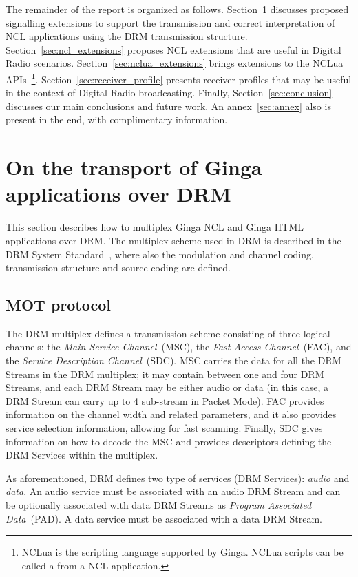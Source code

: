 \documentclass[11pt]{article}
\begin{document}
The remainder of the report is organized as follows.
Section~\ref{sec:transport} discusses proposed signalling extensions
to support the transmission and correct interpretation of NCL applications
using the DRM transmission structure.
Section~\ref{sec:ncl_extensions} proposes NCL extensions that are useful in
Digital Radio scenarios.
Section~\ref{sec:nclua_extensions} brings extensions to the NCLua
APIs~\footnote{NCLua is the scripting language supported by Ginga. NCLua
  scripts can be called a from a NCL application.}.
Section~\ref{sec:receiver_profile} presents receiver profiles that may be
useful in the context of Digital Radio broadcasting.
Finally, Section~\ref{sec:conclusion} discusses our main conclusions and future
work. An annex~\ref{sec:annex} also is present in the end, with complimentary information.

\section{On the transport of Ginga applications over DRM}
\label{sec:transport}

This section describes how to multiplex Ginga NCL and Ginga HTML applications over
DRM. The multiplex scheme used in DRM is described in the DRM System
Standard~\cite{ETSI-201980-2014}, where also the modulation and channel
coding, transmission structure and source coding are defined.

\subsection{MOT protocol}
The DRM multiplex defines a transmission scheme consisting of three logical channels: the
\emph{Main Service Channel}~(MSC), the \emph{Fast Access Channel}~(FAC),
and the \emph{Service Description Channel}~(SDC). MSC carries the data for all the DRM Streams in the DRM multiplex;
it may contain between one and four DRM Streams, and each DRM Stream may be
either audio or data (in this case, a DRM Stream can carry up to 4
sub-stream in Packet Mode).
FAC provides information on the channel width and related parameters, and it
also provides service selection information, allowing for fast scanning.
Finally, SDC gives information on how to decode the MSC and provides
descriptors defining the DRM Services within the multiplex.

As aforementioned, DRM defines two type of services (DRM Services): \emph{audio} and
\emph{data}.
An audio service must be associated with an audio DRM Stream and
can be optionally associated with data DRM Streams as \emph{Program
  Associated Data}~(PAD). A data service must be associated with a
data DRM Stream.
\end{document}
